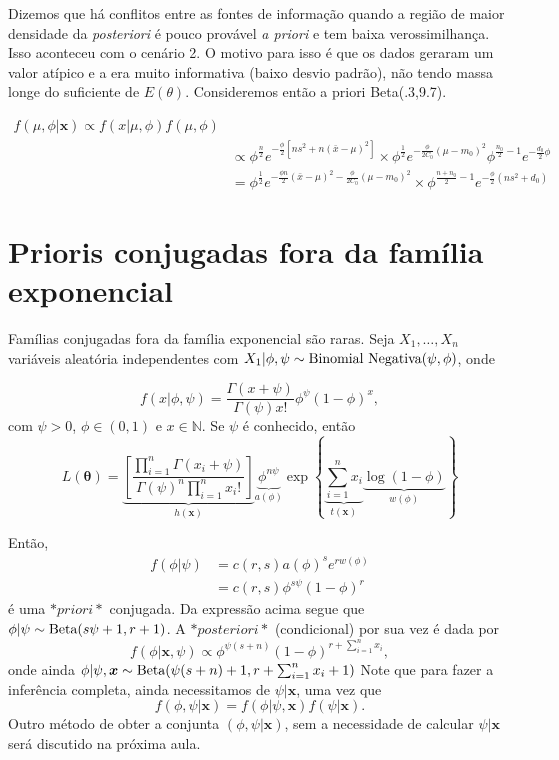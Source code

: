 \documentclass[
  letterpaper,
  DIV=11,
  numbers=noendperiod]{scrreprt}
\theoremstyle{definition}
\theoremstyle{definition}
\theoremstyle{remark}
\begin{document}
Dizemos que há conflitos entre as fontes de informação quando a região
de maior densidade da \emph{posteriori} é pouco provável \emph{a priori}
e tem baixa verossimilhança. Isso aconteceu com o cenário 2. O motivo
para isso é que os dados geraram um valor atípico e a era muito
informativa (baixo desvio padrão), não tendo massa longe do suficiente
de \(E(\theta)\). Consideremos então a priori Beta(.3,9.7).

\[\begin{align}f(\mu,\phi|\boldsymbol{x})\propto f(x|\mu,\phi)f(\mu,\phi)\\
&\propto \phi^{\frac{n}{2}}e^{-\frac{\phi}{2}[ns^2 + n(\bar{x}-\mu)^2]}\times \phi^{\frac{1}{2}}e^{-\frac{\phi}{2C_0}(\mu-m_0)^2}\phi^{\frac{n_0}{2}-1}e^{-\frac{d_0}{2}\phi}\\
&= \phi^{\frac{1}{2}}e^{-\frac{\phi n}{2}(\bar{x}-\mu)^2 -\frac{\phi}{2C_0}(\mu-m_0)^2}\times \phi^{\frac{n+n_0}{2}-1}e^{-\frac{\phi}{2}\left(ns^2+d_0\right)}
\end{align}\]

\hypertarget{prioris-conjugadas-fora-da-famuxedlia-exponencial}{%
\section{Prioris conjugadas fora da família
exponencial}\label{prioris-conjugadas-fora-da-famuxedlia-exponencial}}

Famílias conjugadas fora da família exponencial são raras. Seja
\(X_1,\ldots,X_n\) variáveis aleatória independentes com
\(X_1|\phi,\psi\sim\hbox{Binomial Negativa}(\psi,\phi)\), onde

\[f(x|\phi,\psi)=\frac{\Gamma(x+\psi)}{\Gamma(\psi)x!}\phi^\psi (1-\phi)^x,\]
com \(\psi>0\), \(\phi\in(0,1)\) e \(x\in\mathbb{N}\). Se \(\psi\) é
conhecido, então
\[L(\boldsymbol{\theta})=\underbrace{\left[\frac{\prod_{i=1}^n\Gamma(x_i+\psi)}{\Gamma(\psi)^n\prod_{i=1}^n x_i!}\right]}_{h(\boldsymbol{x})}\underbrace{\phi^{n\psi}}_{a(\phi)}\exp\left\{ \underbrace{\sum_{i=1}^n x_i}_{t(\boldsymbol{x})} \underbrace{\log(1-\phi)}_{w(\phi)}\right\} \]

Então, \[\begin{align}
f(\phi|\psi)&=c(r,s)a(\phi)^s e^{rw(\phi)}\\
&=c(r,s)\phi^{s\psi}(1-\phi)^{r}
\end{align}\] é uma \(*priori*\) conjugada. Da expressão acima segue que
\(\phi|\psi \sim \hbox{Beta}(s\psi+1,r+1)\). A \(*posteriori*\)
(condicional) por sua vez é dada por
\[f(\phi|\boldsymbol{x},\psi)\varpropto \phi^{\psi(s+n)}(1-\phi)^{r+\sum_{i=1}^{n}x_i},\]
onde ainda
\(\phi|\psi,\boldsymbol{x}\sim\hbox{Beta}(\psi(s+n)+1,r+\sum_{i=1}^{n}x_i+1)\)
Note que para fazer a inferência completa, ainda necessitamos de
\(\psi|\boldsymbol{x}\), uma vez que
\[f(\phi,\psi|\boldsymbol{x})=f(\phi|\psi,\boldsymbol{x})f(\psi|\boldsymbol{x}).\]
Outro método de obter a conjunta \((\phi,\psi|\boldsymbol{x})\), sem a
necessidade de calcular \(\psi|\boldsymbol{x}\) será discutido na
próxima aula.
\end{document}
